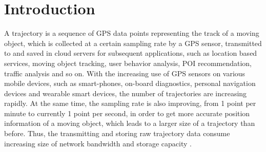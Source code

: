 \section{Introduction}
\label{sec-into}

A trajectory is a sequence of GPS data points representing the track of a moving object, which is collected at a certain sampling rate by a GPS sensor, transmitted to and saved in cloud servers for subsequent applications, such as location based services, moving object tracking, user behavior analysis, POI recommendation, {traffic analysis} and so on.
%
With the increasing use of GPS sensors on various mobile devices, such as smart-phones, on-board diagnostics, personal navigation devices and wearable smart devices, the number of trajectories are increasing rapidly.
At the same time, the sampling rate is also improving, \eg from 1 point per minute to currently 1 point per second, in order to get more accurate position information of a moving object, which leads to a larger size of a trajectory than before. Thus, the transmitting and storing raw trajectory data consume increasing size of network bandwidth and storage capacity \cite{Chen:Trajectory,  Chen:Fast, Meratnia:Spatiotemporal, Keogh:online, Liu:BQS, Muckell:Compression,Cao:Spatio, Popa:Spatio, Schmid:Semantic,Richter:Semantic,Long:Direction,Nibali:Trajic}.

